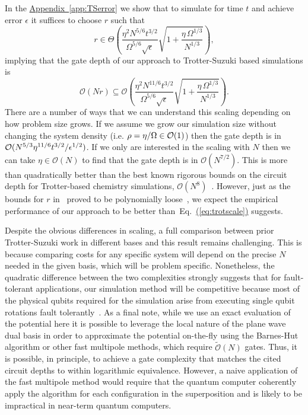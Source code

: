 \documentclass[superscriptaddress,aps,pra,nofootinbib,notitlepage,10pt,longbibliography]{revtex4-1}
\newcommand{\eq}[1]{Eq.~\hyperref[eq:#1]{(\ref*{eq:#1})}}
\DeclareRobustCommand{\app}[1]{\hyperref[app:#1]{Appendix~\ref*{app:#1}}}
\begin{document}
In the \app{TSerror} we show that to simulate for time $t$ and achieve error $\epsilon$ it suffices to choose $r$ such that
\begin{equation}
r\in{\Theta}\left(\frac{\eta^2 N^{5/6}t^{3/2}}{\Omega^{5/6}\sqrt{\epsilon}}\sqrt{1+\frac{\eta\,\Omega^{1/3}}{N^{1/3}}} \right),
\end{equation}
implying that the gate depth of our approach to Trotter-Suzuki based simulations is
\begin{equation}
\mathcal{O}(Nr) \subseteq \mathcal{O}\left(\frac{\eta^2 N^{11/6}t^{3/2}}{\Omega^{5/6}\sqrt{\epsilon}}\sqrt{1+\frac{\eta\,\Omega^{1/3}}{N^{1/3}}}\right).
\label{eq:trotscale}
\end{equation}
There are a number of ways that we can understand this scaling depending on how problem size grows. If we assume we grow our simulation size without changing the system density (i.e. $\rho = \eta / \Omega \in {\cal O}(1)$) then the gate depth is in ${\cal O}(N^{5/3} \eta^{11/6} t^{3/2} / \epsilon^{1/2})$. If we only are interested in the scaling with $N$ then we can take $\eta \in \mathcal{O}(N)$ to find that the gate depth is in $\mathcal{O}(N^{7/2})$. This is more than quadratically better than the best known rigorous bounds on the circuit depth for Trotter-based chemistry simulations, $\mathcal{O}(N^8)$~\cite{Wecker2015a}.  However, just as the bounds for $r$ in~\cite{Wecker2015a} proved to be polynomially loose~\cite{Poulin2014,BabbushTrotter}, we expect the empirical performance of our approach to be better than~\eq{trotscale} suggests.

Despite the obvious differences in scaling, a full comparison between prior Trotter-Suzuki work in different bases and this result remains challenging. This is because comparing costs for any specific system will depend on the precise $N$ needed in the given basis, which will be problem specific. Nonetheless, the quadratic difference between the two complexities strongly suggests that for fault-tolerant applications, our simulation method will be competitive because most of the physical qubits required for the simulation arise from executing single qubit rotations fault tolerantly~\cite{Reiher2017,Jones2012}. As a final note, while we use an exact evaluation of the potential here it is possible to leverage the local nature of the plane wave dual basis in order to approximate the potential on-the-fly using the Barnes-Hut algorithm or other fast multipole methods, which require $\widetilde{\mathcal{O}}(N)$ gates. Thus, it is possible, in principle, to achieve a gate complexity that matches the cited circuit depths to within logarithmic equivalence.  However, a naive application of the fast multipole method would require that the quantum computer coherently apply the algorithm for each configuration in the superposition and is likely to be impractical in near-term quantum computers.
\end{document}
